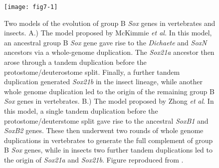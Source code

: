 \begin{figure}
\centering
\texttt{[image: fig7-1]}
\caption[Two models of the evolution of group B \emph{Sox} genes in vertebrates and insects]{Two models of the evolution of group B \emph{Sox} genes in vertebrates and insects. A.) The model proposed by McKimmie \emph{et al.} In this model, an ancestral group B \emph{Sox} gene gave rise to the \emph{Dichaete} and \emph{SoxN} ancestors via a whole-genome duplication. The \emph{Sox21a} ancestor then arose through a tandem duplication before the protostome/deuterostome split. Finally, a further tandem duplication generated \emph{Sox21b} in the insect lineage, while another whole genome duplication led to the origin of the remaining group B \emph{Sox} genes in vertebrates. B.) The model proposed by Zhong \emph{et al}. In this model, a single tandem duplication before the protostome/deuterstome split gave rise to the ancestral \emph{SoxB1} and \emph{SoxB2} genes. These then underwent two rounds of whole genome duplications in vertebrates to generate the full complement of group B \emph{Sox} genes, while in insects two further tandem duplications led to the origin of \emph{Sox21a} and \emph{Sox21b}. Figure reproduced from \citet{zhong_parallel_2011}.}
\label{Figure 7.1}
\end{figure}

